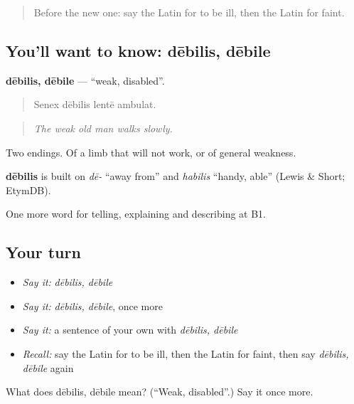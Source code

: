 \begin{quote}
Before the new one: say the Latin for to be ill, then the Latin for faint.
\end{quote}

\subsection*{You'll want to know: dēbilis, dēbile}
\textbf{dēbilis, dēbile} — \textquotedblleft{}weak, disabled\textquotedblright{}.

\begin{quote}
Senex dēbilis lentē ambulat.
\end{quote}

\begin{quote}
\emph{The weak old man walks slowly.}
\end{quote}

Two endings. Of a limb that will not work, or of general weakness.

\begin{cousinweb}
\textbf{dēbilis} is built on \emph{dē-} \textquotedblleft{}away from\textquotedblright{} and \emph{habilis} \textquotedblleft{}handy, able\textquotedblright{} (Lewis \& Short; EtymDB).
\end{cousinweb}

\begin{grammarlens}[title={What you've built}]
One more word for telling, explaining and describing at B1.
\end{grammarlens}

\subsection*{Your turn}
\begin{itemize}
\raggedright
  \item \emph{Say it:} \emph{dēbilis, dēbile}
  \item \emph{Say it:} \emph{dēbilis, dēbile}, once more
  \item \emph{Say it:} a sentence of your own with \emph{dēbilis, dēbile}
  \item \emph{Recall:} say the Latin for to be ill, then the Latin for faint, then say \emph{dēbilis, dēbile} again
\end{itemize}

\begin{tcolorbox}[breakable,colback=teal!4,colframe=teal!35!black,title={Before you move on}]
What does dēbilis, dēbile mean? (\textquotedblleft{}Weak, disabled\textquotedblright{}.) Say it once more.
\end{tcolorbox}
